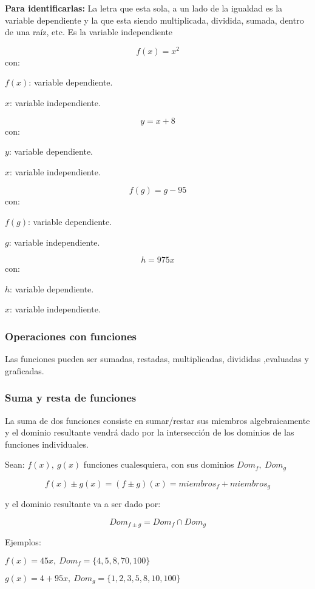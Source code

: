     \textbf{Para identificarlas:} La letra que esta sola, a un lado de la
    igualdad es la variable dependiente y la que esta siendo multiplicada, dividida,
    sumada, dentro de una raíz, etc. Es la variable independiente

    $$ f(x) = x^2 $$
    con:

    $ f(x) $: variable dependiente.

    $x$: variable independiente.

    $$ y = x+8 $$
    con:

    $ y $: variable dependiente.

    $x$: variable independiente.

    $$ f(g) = g-95 $$
    con:

    $ f(g) $: variable dependiente.

    $g$: variable independiente.

    $$ h = 975x $$
        con:

    $ h$: variable dependiente.

    $x$: variable independiente.

\subsubsection*{Operaciones con funciones} \label{Operaciones_con_funciones}

    Las funciones pueden ser sumadas, restadas, multiplicadas, divididas
    ,evaluadas y graficadas.


\subsubsection*{Suma y resta de funciones} \label{Suma_de_funciones}

La suma de dos funciones consiste en sumar/restar sus miembros algebraicamente y el
dominio resultante vendrá dado por la intersección de los dominios de las
funciones individuales.

Sean: $ f(x),\ g(x) $ funciones cualesquiera, con sus dominios $ Dom_f,\ Dom_g $

    $$ f(x)\pm g(x)=(f\pm g)(x)= miembros_f + miembros_g $$

y el dominio resultante va a ser dado por:


    $$ Dom_{f\pm g}= Dom_f \cap Dom_g $$


    Ejemplos:

    $ f(x)= 45x,\ Dom_f=\{4,5,8,70,100\} $

    $ g(x)=4 +95x,\ Dom_g= \{1,2,3,5,8,10,100\}$
\\

